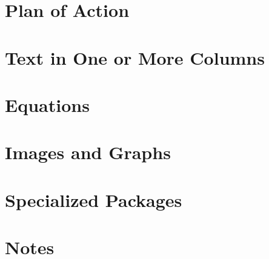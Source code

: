 

\begin{abstract}
    In this article we will be exploring development and creation of accessible documents using \LaTeX.\/ This will include commonly used commands, types of mathematical equations, imported images, TiKz images, and tables.  Parts of the document will also test the effects of making multiple columns and using tcolorboxes.  Ultimately we will be trying to maximize the accessibility of the generated pdf, but acknowleding the inherent shortcomings of pdf documents, we will also be looking to generate HTML directly from the source code using Pandoc, \TeX 4ht, and \LaTeX ML.
\end{abstract}


\section{Plan of Action}


\section{Text in One or More Columns}


\section{Equations}


\section{Images and Graphs}


\section{Specialized Packages}


\section{Notes}
    